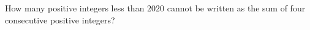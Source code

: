 How many positive integers less than $2020$ cannot be written as the sum of four consecutive positive integers?
